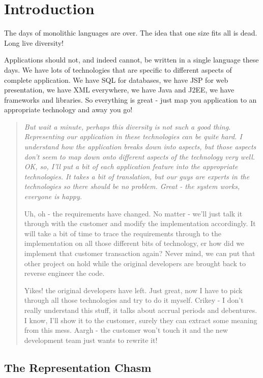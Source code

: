 \chapter{Introduction}

The days of monolithic languages are over. The idea that one size
fits all is dead. Long live diversity! 

Applications should not, and indeed cannot, be written in a single
language these days. We have lots of technologies that are specific
to different aspects of complete application. We have SQL for databases,
we have JSP for web presentation, we have XML everywhere, we have
Java and J2EE, we have frameworks and libraries. So everything is
great - just map you application to an appropriate technology and
away you go! \normalsize

\begin{quotation}
{\em But wait a minute, perhaps this diversity is not such a good
thing. Representing our application in these technologies can be quite
hard. I understand how the application breaks down into aspects, but
those aspects don't seem to map down onto different aspects of the
technology very well. OK, so, I'll put a bit of each application feature
into the appropriate technologies. It takes a bit of translation,
but our guys are experts in the technologies so there should be no
problem. Great - the system works, everyone is happy.

Uh, oh - the requirements have changed. No matter - we'll just
talk it through with the customer and modify the implementation accordingly.
It will take a bit of time to trace the requirements through to the
implementation on all those different bits of technology, er how did
we implement that customer transaction again? Never mind, we can put
that other project on hold while the original developers are brought
back to reverse engineer the code.

Yikes! the original developers have left. Just great, now I
have to pick through all those technologies and try to do it myself.
Crikey - I don't really understand this stuff, it talks about accrual
periods and debentures. I know, I'll show it to the customer, surely
they can extract some meaning from this mess. Aargh - the customer
won't touch it and the new development team just wants to rewrite
it!}
\end{quotation}

\normalsize


\section{The Representation Chasm}

